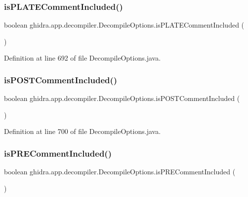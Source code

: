 \subsubsection{\texorpdfstring{isPLATECommentIncluded()}{isPLATECommentIncluded()}}
{\footnotesize\ttfamily boolean ghidra.\+app.\+decompiler.\+Decompile\+Options.\+is\+P\+L\+A\+T\+E\+Comment\+Included (\begin{DoxyParamCaption}{ }\end{DoxyParamCaption})\hspace{0.3cm}{\ttfamily [inline]}}



Definition at line 692 of file Decompile\+Options.\+java.

\mbox{\label{classghidra_1_1app_1_1decompiler_1_1_decompile_options_ae53fc6f71e3e555a78d6d738503e1041}} 
\subsubsection{\texorpdfstring{isPOSTCommentIncluded()}{isPOSTCommentIncluded()}}
{\footnotesize\ttfamily boolean ghidra.\+app.\+decompiler.\+Decompile\+Options.\+is\+P\+O\+S\+T\+Comment\+Included (\begin{DoxyParamCaption}{ }\end{DoxyParamCaption})\hspace{0.3cm}{\ttfamily [inline]}}



Definition at line 700 of file Decompile\+Options.\+java.

\mbox{\label{classghidra_1_1app_1_1decompiler_1_1_decompile_options_a53327e182f160e79621205e9059fde07}} 
\subsubsection{\texorpdfstring{isPRECommentIncluded()}{isPRECommentIncluded()}}
{\footnotesize\ttfamily boolean ghidra.\+app.\+decompiler.\+Decompile\+Options.\+is\+P\+R\+E\+Comment\+Included (\begin{DoxyParamCaption}{ }\end{DoxyParamCaption})\hspace{0.3cm}{\ttfamily [inline]}}




